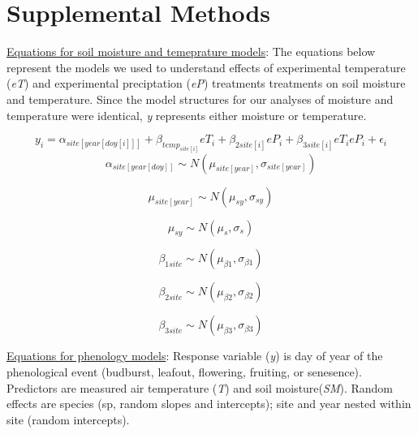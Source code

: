 \documentclass{article}
\begin{document}
\begin{singlespace}
\end{singlespace}


\clearpage

\section* {Supplemental Methods}
\underline{Equations for soil moisture and temeprature models}: 
The equations below represent the models we used to understand effects of experimental temperature (\textit{eT}) and experimental preciptation (\textit{eP}) treatments treatments on soil moisture and temperature. Since the model structures for our analyses of moisture and temperature were identical, \textit{y} represents either moisture or temperature. 

\begin{equation}
y_{i}=\alpha_{site[year[doy[i]]]}+ \beta_{temp_{site[i]}}eT_i+\beta_{2 site[i]}eP_i+\beta_{3 site[i]}eT_ieP_i+\epsilon_{i}\label{eq:1}
\end{equation}
\begin{equation}
\alpha_{site[year[doy]]}\sim N(\mu_{site[year]}, \sigma_{site[year]})\label{eq:2}
\end{equation}

\begin{equation}
\mu_{site[year]} \sim N(\mu_{sy}, \sigma_{sy})\label{eq:3}
\end{equation}

\begin{equation}
\mu_{sy} \sim N(\mu_{s}, \sigma_{s})\label{eq:4}
\end{equation}

\begin{equation}
\beta_{1 site} \sim N(\mu_{\beta1}, \sigma_{\beta1})\label{eq:5}
\end{equation}

\begin{equation}
\beta_{2 site} \sim N(\mu_{\beta2}, \sigma_{\beta2})\label{eq:6}
\end{equation}

\begin{equation}
\beta_{3 site} \sim N(\mu_{\beta3}, \sigma_{\beta3})\label{eq:7}
\end{equation}

\underline{Equations for phenology models}: 
 Response variable (\textit{y}) is day of year of the phenological event (budburst, leafout, flowering, fruiting, or senesence). Predictors are measured air temperature (\textit{T}) and soil moisture(\textit{SM}). Random effects are species (sp, random slopes and intercepts); site and year nested within site (random intercepts).
\end{document}
